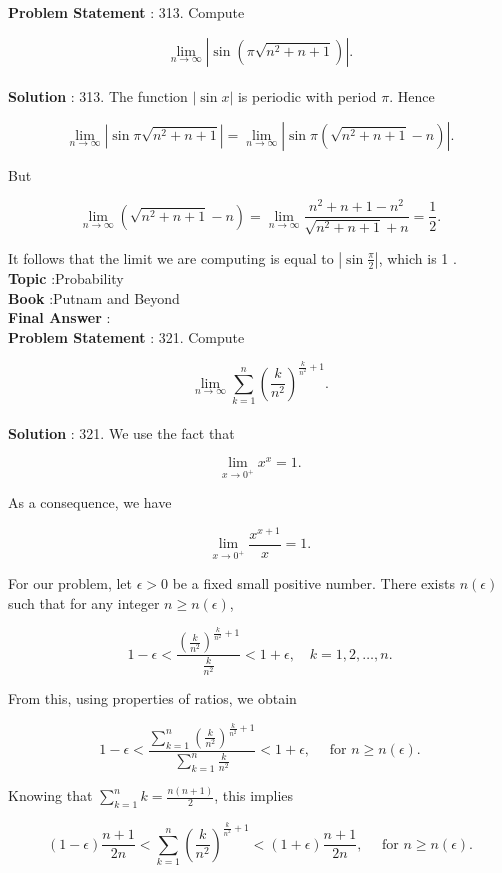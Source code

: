 \documentclass[10pt]{article}
\begin{document}
\textbf{Problem Statement} :
313. Compute

$$
\lim _{n \rightarrow \infty}\left|\sin \left(\pi \sqrt{n^{2}+n+1}\right)\right| .
$$
\\
\textbf{Solution} :
313. The function $|\sin x|$ is periodic with period $\pi$. Hence

$$
\lim _{n \rightarrow \infty}\left|\sin \pi \sqrt{n^{2}+n+1}\right|=\lim _{n \rightarrow \infty}\left|\sin \pi\left(\sqrt{n^{2}+n+1}-n\right)\right| .
$$

But

$$
\lim _{n \rightarrow \infty}\left(\sqrt{n^{2}+n+1}-n\right)=\lim _{n \rightarrow \infty} \frac{n^{2}+n+1-n^{2}}{\sqrt{n^{2}+n+1}+n}=\frac{1}{2} .
$$

It follows that the limit we are computing is equal to $\left|\sin \frac{\pi}{2}\right|$, which is 1 .
\\
\textbf{Topic} :Probability\\
\textbf{Book} :Putnam and Beyond\\
\textbf{Final Answer} :\\


\textbf{Problem Statement} :
321. Compute

$$
\lim _{n \rightarrow \infty} \sum_{k=1}^{n}\left(\frac{k}{n^{2}}\right)^{\frac{k}{n^{2}}+1} .
$$
\\
\textbf{Solution} :
321. We use the fact that

$$
\lim _{x \rightarrow 0^{+}} x^{x}=1 .
$$

As a consequence, we have

$$
\lim _{x \rightarrow 0^{+}} \frac{x^{x+1}}{x}=1 .
$$

For our problem, let $\epsilon>0$ be a fixed small positive number. There exists $n(\epsilon)$ such that for any integer $n \geq n(\epsilon)$,

$$
1-\epsilon<\frac{\left(\frac{k}{n^{2}}\right)^{\frac{k}{n^{2}}+1}}{\frac{k}{n^{2}}}<1+\epsilon, \quad k=1,2, \ldots, n .
$$

From this, using properties of ratios, we obtain

$$
1-\epsilon<\frac{\sum_{k=1}^{n}\left(\frac{k}{n^{2}}\right)^{\frac{k}{n^{2}}+1}}{\sum_{k=1}^{n} \frac{k}{n^{2}}}<1+\epsilon, \quad \text { for } n \geq n(\epsilon) .
$$

Knowing that $\sum_{k=1}^{n} k=\frac{n(n+1)}{2}$, this implies

$$
(1-\epsilon) \frac{n+1}{2 n}<\sum_{k=1}^{n}\left(\frac{k}{n^{2}}\right)^{\frac{k}{n^{2}}+1}<(1+\epsilon) \frac{n+1}{2 n}, \quad \text { for } n \geq n(\epsilon) .
$$
\end{document}
